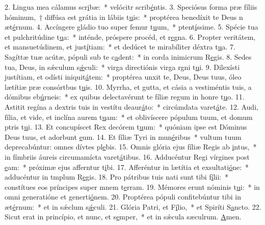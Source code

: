 2. Lingua mea cálamus scr\uline{i}bæ:~* velócitr scrib\uline{é}ntis.
3. Speciósus forma præ fíliis hóminum,~† diffúsa est grátia in lábiis t\uline{u}is:~* proptérea benedíxit te Deus n æt\uline{é}rnum.
4. Accíngere gládio tuo super femur t\uline{u}um,~* ptent\uline{í}ssime.
5. Spécie tua et pulchritúdine t\uline{u}a:~* inténde, próspere procéd, et r\uline{e}gna.
6. Propter veritátem, et mansuetúdinem, et just\uline{í}tiam:~* et dedúcet te mirabíliter déxtra t\uline{u}a.
7. Sagíttæ tuæ acútæ, pópuli sub te c\uline{a}dent:~* in corda inimicrum R\uline{e}gis.
8. Sedes tua, Deus, in sǽculum s\uline{ǽ}culi:~* virga directiónis virga rgni t\uline{u}i.
9. Dilexísti justítiam, et odísti iniquit\uline{á}tem:~* proptérea unxit te, Deus, Deus tuus, óleo lætítiæ præ consórtbus t\uline{u}is.
10. Myrrha, et gutta, et cásia a vestiméntis tuis, a dómibus eb\uline{ú}rneis:~* ex quibus delectavérunt te fíliæ regum in honre t\uline{u}o.
11. Astitit regína a dextris tuis in vestítu deaur\uline{á}to:~* circúmdata varet\uline{á}te.
12. Audi, fília, et vide, et inclína aurem t\uline{u}am:~* et oblivíscere pópulum tuum, et domum ptris t\uline{u}i.
13. Et concupíscet Rex decórem t\uline{u}um:~* quóniam ipse est Dóminus Deus tuus, et adorbunt \uline{e}um.
14. Et fíliæ Tyri in mun\uline{é}ribus~* vultum tuum deprecabúntur: omnes dívtes pl\uline{e}bis.
15. Omnis glória ejus fíliæ Regis ab \uline{i}ntus,~* in fímbriis áureis circumamícta varet\uline{á}tibus.
16. Adducéntur Regi vírgines post \uline{e}am:~* próximæ ejus afferntur t\uline{i}bi.
17. Afferéntur in lætítia et exsultati\uline{ó}ne:~* adducéntur in tmplum R\uline{e}gis.
18. Pro pátribus tuis nati sunt tibi f\uline{í}lii:~* constítues eos príncipes super mnem t\uline{e}rram.
19. Mémores erunt nóminis t\uline{u}i:~* in omni generatióne et generti\uline{ó}nem.
20. Proptérea pópuli confitebúntur tibi in æt\uline{é}rnum:~* et in sǽclum s\uline{ǽ}culi.
21. Glória Patri, et F\uline{í}lio,~* et Spiríti S\uline{a}ncto.
22. Sicut erat in princípio, et nunc, et s\uline{e}mper,~* et in sǽcula sæculrum. \uline{A}men.

